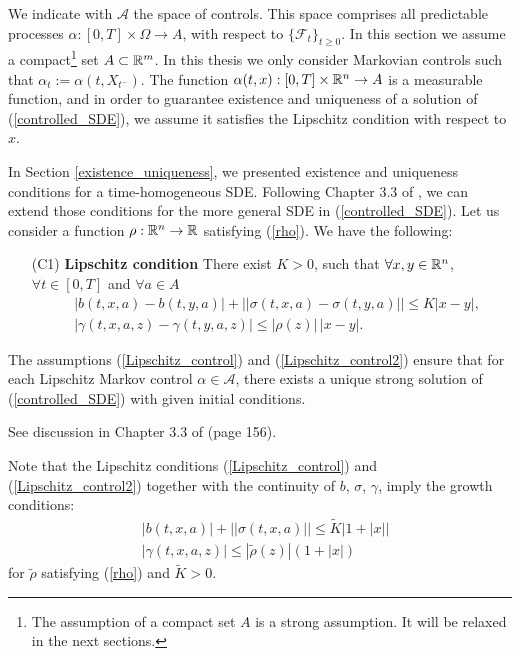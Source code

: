 We indicate with $\mathcal{A}$ the space of controls.
This space comprises all predictable processes $\alpha: [0,T]\times \Omega \to  A$, with respect to $\{\mathcal{F}_{t}\}_{t\geq 0}$.
In this section we assume a compact\footnote{The assumption of a compact set $A$ is a strong assumption. It will be relaxed in the next sections.} set $A \subset \mathbb{R}^m$.
In this thesis we only consider Markovian controls such that $\alpha_t := \alpha(t,X_{t^-}) $.
The function $\alpha(t,x) : [0,T] \times \mathbb{R}^n \to A$ is a measurable function, and 
in order to guarantee existence and uniqueness of a solution of (\ref{controlled_SDE}), we assume it satisfies the Lipschitz condition with respect to $x$.

In Section \ref{existence_uniqueness}, we presented existence and uniqueness conditions for a time-homogeneous SDE. 
Following Chapter 3.3 of \cite{Skorohod}, we can extend 
those conditions for the more general SDE in (\ref{controlled_SDE}).
Let us consider a function $\rho : \mathbb{R}^n \to \mathbb{R} $ satisfying (\ref{rho}).
We have the following:
\begin{itemize}
 \item[(C1)] \textbf{Lipschitz condition} There exist $K >0$, such that $\forall x,y \in \mathbb{R}^n$, $\forall t \in [0,T]$ and $\forall a \in A$
 \begin{align}\label{Lipschitz_control}
  &|b(t,x,a) - b(t,y,a)| + || \sigma(t,x,a) - \sigma(t,y,a) || \leq K |x-y|,\\  
  & |\gamma(t,x,a,z) - \gamma(t,y,a,z)| \leq |\rho(z)|\,|x-y|. \label{Lipschitz_control2}
 \end{align}
\end{itemize}
\begin{Theorem}
 The assumptions (\ref{Lipschitz_control}) and (\ref{Lipschitz_control2}) 
 ensure that for each Lipschitz Markov control $\alpha \in \mathcal{A}$, there exists a unique strong solution of (\ref{controlled_SDE}) with given initial 
 conditions.
\end{Theorem}
See discussion in Chapter 3.3 of \cite{Skorohod} (page 156).

Note that the Lipschitz conditions (\ref{Lipschitz_control}) and (\ref{Lipschitz_control2}) together with the continuity of $b$, $\sigma$, $\gamma$, imply the growth conditions:
\begin{align}
 & |b(t,x,a)| + ||\sigma(t,x,a)||  \leq \tilde K |1+|x|| \\  
 & | \gamma(t,x,a,z) | \leq |\tilde \rho(z)| (1+|x|) \label{Growth_control2}
\end{align}
for $\tilde \rho$ satisfying (\ref{rho}) and $\tilde K > 0$.

